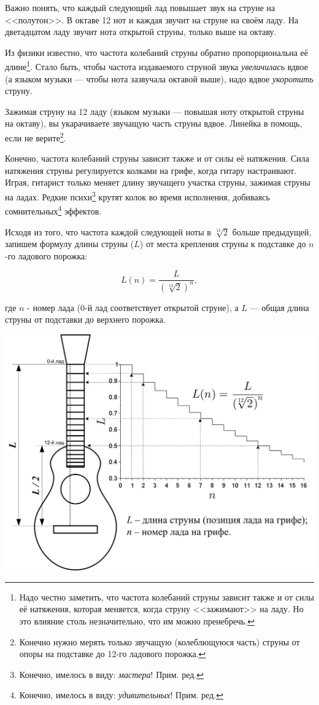 Важно понять, что каждый следующий лад повышает звук на струне на <<полутон>>. В октаве 12 нот и каждая звучит на струне на своём ладу. На дветадцатом ладу звучит нота открытой струны, только выше на октаву.

Из физики известно, что частота колебаний струны обратно пропорциональна её длине\footnote{Надо честно заметить, что частота колебаний струны зависит также и от силы её натяжения, которая меняется, когда струну <<зажимают>> на ладу. Но это влияние столь незначительно, что им можно пренебречь.}. Стало быть, чтобы частота издаваемого струной звука \emph{увеличилась} вдвое (а языком музыки --- чтобы нота зазвучала октавой выше), надо вдвое \emph{укоротить} струну. 

Зажимая струну на 12 ладу (языком музыки --- повышая ноту открытой струны на октаву), вы укарачиваете звучащую часть струны вдвое. Линейка в помощь, если не верите\footnote{Конечно нужно мерять только звучащую (колеблющуюся часть) струны от опоры на подставке до 12-го ладового порожка.}.

Конечно, частота колебаний струны зависит также и от силы её натяжения. Сила натяжения струны регулируется колками на грифе, когда гитару настраивают. Играя, гитарист только меняет длину звучащего участка струны, зажимая струны на ладах. Редкие психи\footnote{Конечно, имелось в виду: \emph{мастера}! Прим. ред.} крутят колок во время исполнения, добиваясь сомнительных\footnote{Конечно, имелось в виду: \emph{удивительных}! Прим. ред.} эффектов.

Исходя из того, что частота каждой следующей ноты в $\sqrt[12]{2}$ больше предыдущей, запишем формулу длины струны ($L$) от места крепления струны к подставке до $n$-го ладового порожка:

\begin{equation}
    \label{fig:guitar:construction:length}
    L(n)=\frac{L}{(\sqrt[12]{2})^n},
\end{equation}

где $n$ - номер лада ($0$-й лад соответствует открытой струне), а $L$ --- общая длина струны от подставки до верхнего порожка.


\includegraphics{fig/string-length.png}


